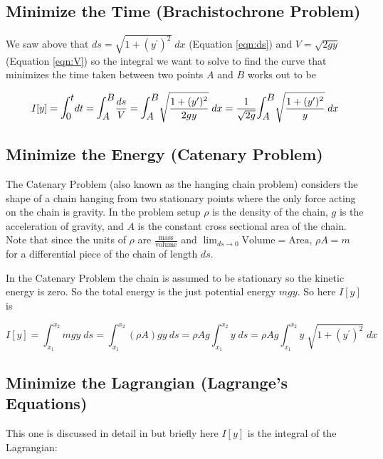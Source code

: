 \documentclass{article}
\theoremstyle{definition}
\begin{document}
\medskip
\subsection{Minimize the Time (Brachistochrone Problem)}
We saw above that $ds = \sqrt{1 + (y^{\prime})^2} \; dx$	
(Equation \ref{eqn:ds}) and $V = \sqrt{2gy}$ (Equation 
\ref{eqn:V}) so the integral we want to solve to find the 
curve that minimizes the time taken between two points $A$ 
and $B$ works out to be 

\bigskip
\begin{equation*}
I[y]
= \mathlarger{\mathlarger{\int_0^t}} dt = \mathlarger{\mathlarger{\int_A^B}} \dfrac{ds}{V} 
= \mathlarger{\mathlarger{\int_A^B}} \sqrt{\dfrac{1 + (y^{\prime})^2}{2gy}} \; dx
= \dfrac{1}{\sqrt{2g}} \mathlarger{\mathlarger{\int_A^B}} \sqrt{\dfrac{1 + (y^{\prime})^2}{y}} \; dx
\end{equation*}

\medskip
\subsection{Minimize the Energy (Catenary Problem)}
The Catenary Problem \cite{wiki:catenary} (also known as the
hanging chain problem) considers the shape of a chain hanging
from two stationary points where the only force acting on the
chain is gravity. In the problem setup $\rho$ is the density of
the chain, $g$ is the acceleration of gravity, and $A$ is the
constant cross sectional area of the chain.  Note that since the
units of $\rho$ are $\frac{\text{mass}}{\text{volume}}$ and
${\displaystyle \lim_{ds \to 0} \text{Volume} = \text{Area}}$,
$\rho A = m$ for a differential piece of the chain of length
$ds$.


\bigskip
\noindent
In the Catenary Problem the chain is assumed to be stationary so
the kinetic energy is zero. So the total energy is the just
potential energy $mgy$. So here $I[y]$ is


\bigskip
\begin{equation*}
I[y]
= \int_{x_1}^{x_2} mgy \; ds
= \int_{x_1}^{x_2} (\rho A) g y \: ds 
= \rho A g \int_{x_1}^{x_2} y \; ds 
= \rho A g\int_{x_1}^{x_2} y \; \sqrt{1 + (y^{\prime})^2} \; dx
\end{equation*}

\medskip
\subsection{Minimize the Lagrangian (Lagrange's Equations)}
This one is discussed in detail in \cite{notes:pola} but briefly
here $I[y]$ is the integral of the Lagrangian:
\end{document}
